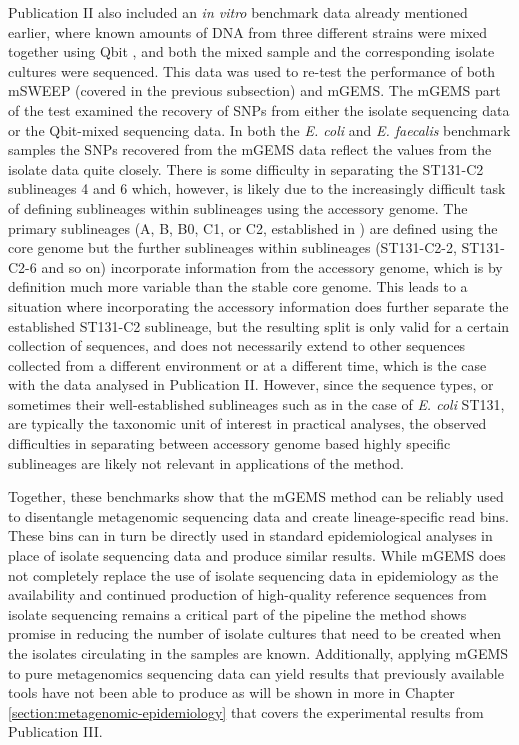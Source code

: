 \documentclass[officiallayout]{tktla}
\begin{document}
Publication II also included an \textit{in vitro} benchmark data
already mentioned earlier, where known amounts of DNA from three
different strains were mixed together using Qbit
\citep{maklin_bacterial_2021}, and both the mixed sample and the
corresponding isolate cultures were sequenced. This data was used to
re-test the performance of both mSWEEP (covered in the previous
subsection) and mGEMS. The mGEMS part of the test examined the
recovery of SNPs from either the isolate sequencing data or the
Qbit-mixed sequencing data. In both the \textit{E. coli} and
\textit{E. faecalis} benchmark samples the SNPs recovered from the
mGEMS data reflect the values from the isolate data quite
closely. There is some difficulty in separating the ST131-C2
sublineages 4 and 6 which, however, is likely due to the increasingly
difficult task of defining sublineages within sublineages using the
accessory genome. The primary sublineages (A, B, B0, C1, or C2,
established in \citep{kallonen2017systematic}) are defined using the
core genome but the further sublineages within sublineages
(ST131-C2-2, ST131-C2-6 and so on) incorporate information from the
accessory genome, which is by definition much more variable than the
stable core genome. This leads to a situation where incorporating the
accessory information does further separate the established ST131-C2
sublineage, but the resulting split is only valid for a certain
collection of sequences, and does not necessarily extend to other
sequences collected from a different environment or at a different
time, which is the case with the data analysed in Publication
II. However, since the sequence types, or sometimes their
well-established sublineages such as in the case of \textit{E. coli}
ST131, are typically the taxonomic unit of interest in practical
analyses, the observed difficulties in separating between accessory
genome based highly specific sublineages are likely not relevant in
applications of the method.

Together, these benchmarks show that the mGEMS method can be reliably
used to disentangle metagenomic sequencing data and create
lineage-specific read bins. These bins can in turn be directly used in
standard epidemiological analyses in place of isolate sequencing data
and produce similar results. While mGEMS does not completely replace
the use of isolate sequencing data in epidemiology \textemdash{ } as
the availability and continued production of high-quality reference
sequences from isolate sequencing remains a critical part of the
pipeline \textemdash{ } the method shows promise in reducing the
number of isolate cultures that need to be created when the isolates
circulating in the samples are known. Additionally, applying mGEMS to
pure metagenomics sequencing data can yield results that previously
available tools have not been able to produce as will be shown in more
in Chapter \ref{section:metagenomic-epidemiology} that covers the
experimental results from Publication III.
\end{document}
